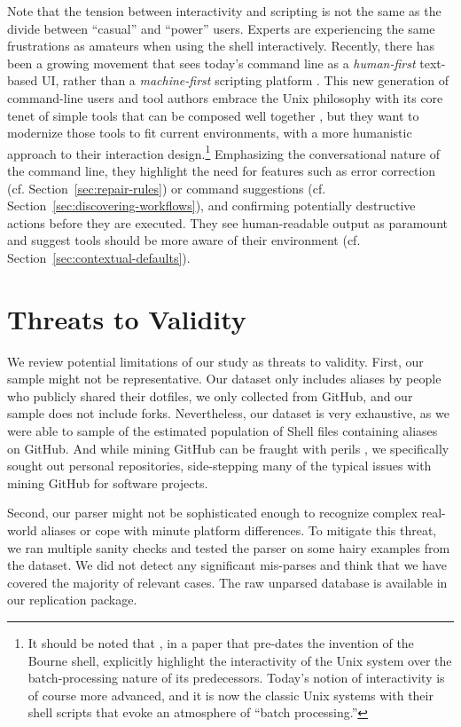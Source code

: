 \documentclass[smallextended,natbib]{svjour3}
\newcommand{\per}[1]{\numprint[\%]{#1}}
\begin{document}
Note that the tension between interactivity and scripting is not the same as the divide between ``casual'' and ``power'' users.
Experts are experiencing the same frustrations as amateurs when using the shell interactively.
Recently, there has been a growing movement that sees today's command line as a \emph{human-first} text-based UI, rather than a \emph{machine-first} scripting platform \citep{clig}.
This new generation of command-line users and tool authors embrace the Unix philosophy with its core tenet of simple tools that can be composed well together \citep{raymond:03}, but they want to modernize those tools to fit current environments, with a more humanistic approach to their interaction design.\footnote{It should be noted that \cite{ritchie:74}, in a paper that pre-dates the invention of the Bourne shell, explicitly highlight the interactivity of the Unix system over the batch-processing nature of its predecessors. Today's notion of interactivity is of course more advanced, and it is now the classic Unix systems with their shell scripts that evoke an atmosphere of ``batch processing.''}
Emphasizing the conversational nature of the command line, they highlight the need for features such as error correction (cf. Section~\ref{sec:repair-rules}) or command suggestions (cf. Section~\ref{sec:discovering-workflows}), and confirming potentially destructive actions before they are executed.
They see human-readable output as paramount and suggest tools should be more aware of their environment (cf. Section~\ref{sec:contextual-defaults}).

\section{Threats to Validity}

We review potential limitations of our study as threats to validity.
First, our sample might not be representative.
Our dataset only includes aliases by people who publicly shared their dotfiles, we only collected from GitHub, and our sample does not include forks.
Nevertheless, our dataset is very exhaustive, as we were able to sample \per{94.09} of the estimated population of Shell files containing aliases on GitHub.
And while mining GitHub can be fraught with perils \citep{kalliamvakou:14}, we specifically sought out personal repositories, side-stepping many of the typical issues with mining GitHub for software projects.

Second, our parser might not be sophisticated enough to recognize complex real-world aliases or cope with minute platform differences.
To mitigate this threat, we ran multiple sanity checks and tested the parser on some hairy examples from the dataset.
We did not detect any significant mis-parses and think that we have covered the majority of relevant cases.
The raw unparsed database is available in our replication package.
\end{document}
